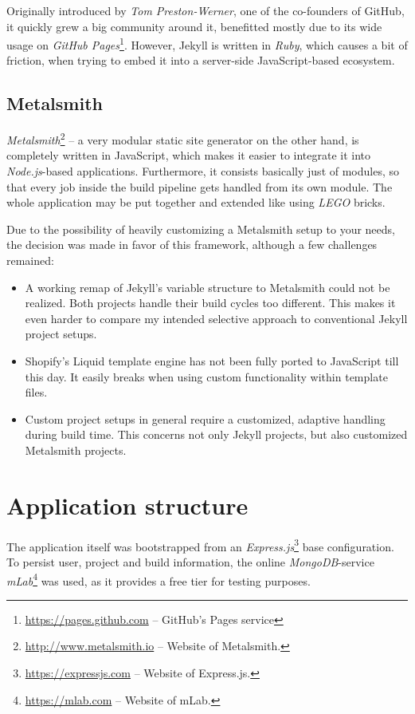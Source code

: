\documentclass[a4paper,english,11pt]{report}
\begin{document}
Originally introduced by \emph{Tom Preston-Werner}, one of the co-founders of GitHub, it quickly grew a big community around it, benefitted mostly due to its wide usage on \emph{GitHub Pages}\footnote{\url{https://pages.github.com} -- GitHub's Pages service}. However, Jekyll is written in \emph{Ruby}, which causes a bit of friction, when trying to embed it into a server-side JavaScript-based ecosystem.

\subsection{Metalsmith}
\emph{Metalsmith}\footnote{\url{http://www.metalsmith.io} -- Website of Metalsmith.} -- a very modular static site generator on the other hand, is completely written in JavaScript, which makes it easier to integrate it into \emph{Node.js}-based applications. Furthermore, it consists basically just of modules, so that every job inside the build pipeline gets handled from its own module. The whole application may be put together and extended like using \emph{LEGO} bricks.

Due to the possibility of heavily customizing a Metalsmith setup to your needs, the decision was made in favor of this framework, although a few challenges remained:

\begin{itemize}
\item A working remap of Jekyll's variable structure to Metalsmith could not be realized. Both projects handle their build cycles too different. This makes it even harder to compare my intended selective approach to conventional Jekyll project setups.
\item Shopify's Liquid template engine has not been fully ported to JavaScript till this day. It easily breaks when using custom functionality within template files.
\item Custom project setups in general require a customized, adaptive handling during build time. This concerns not only Jekyll projects, but also customized Metalsmith projects.
\end{itemize}

\section{Application structure}
The application itself was bootstrapped from an \emph{Express.js}\footnote{\url{https://expressjs.com} -- Website of Express.js.} base configuration. To persist user, project and build information, the online \emph{MongoDB}-service \emph{mLab}\footnote{\url{https://mlab.com} -- Website of mLab.} was used, as it provides a free tier for testing purposes.
\end{document}
